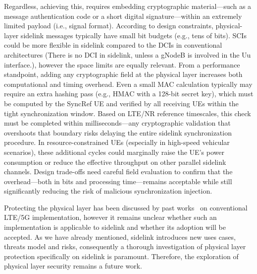 Regardless, achieving this, requires embedding cryptographic material—such as a message authentication code or a short digital signature—within an extremely limited payload (i.e., signal format). According to design constraints, physical-layer sidelink messages typically have small bit budgets (e.g., tens of bits). SCIs could be more flexible in sidelink compared to the DCIs in conventional architectures (There is no DCI in sidelink, unless a gNodeB is involved in the Uu interface.), however the space limits are equally relevant. From a performance standpoint, adding any cryptographic field at the physical layer increases both computational and timing overhead. Even a small MAC calculation typically may require an extra hashing pass (e.g., HMAC with a 128-bit secret key), which must be computed by the SyncRef UE and verified by all receiving UEs within the tight synchronization window. Based on LTE/NR reference timescales, this check must be completed within milliseconds—any cryptographic validation that overshoots that boundary risks delaying the entire sidelink synchronization procedure. In resource-constrained UEs (especially in high-speed vehicular scenarios), these additional cycles could marginally raise the UE’s power consumption or reduce the effective throughput on other parallel sidelink channels. Design trade-offs need careful field evaluation to confirm that the overhead—both in bits and processing time—remains acceptable while still significantly reducing the risk of malicious synchronization injection. 

Protecting the physical layer has been discussed by past works~\cite{oh24:enablingphysicallocalization, Ross24:Broadcasts, ludant24unprotected4g5g} on conventional LTE/5G implementation, however it remains unclear whether such an implementation is applicable to sidelink and whether its adoption will be accepted. As we have already mentioned, sidelink introduces new uses cases, threats model and risks, consequently a thorough investigation of physical layer protection specifically on sidelink is paramount. Therefore, the exploration of physical layer security remains a future work.

